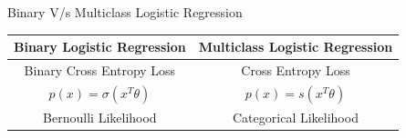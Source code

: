 \documentclass{beamer}
\begin{document}
\begin{frame}{Binary V/s Multiclass Logistic Regression}
\begin{center}
    \begin{tabular}{|c|c|}
    \hline
    \textbf{Binary Logistic Regression} & \textbf{Multiclass Logistic Regression} \\
    \hline
    Binary Cross Entropy Loss& Cross Entropy Loss \\
    \pause
    $p(x) = \sigma(x^T\theta)$ & $p(x) = s(x^T\theta)$ \\
    \pause
    Bernoulli Likelihood & Categorical Likelihood\\
    \hline
  \end{tabular}
\end{center}    
\end{frame}

  
\end{document}
